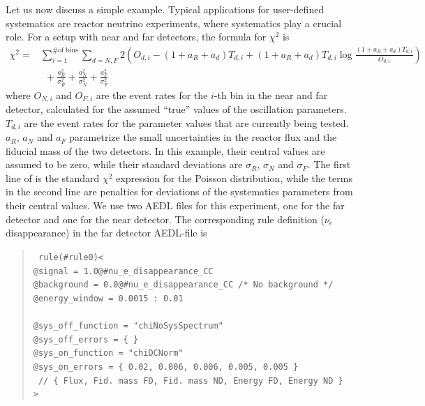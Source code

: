 Let us now discuss a simple example.  Typical applications for user-defined systematics are reactor neutrino experiments, where systematics play a crucial role. For a setup with near and far detectors,
the formula for $\chi^2$ is
\begin{align}
  \chi^2 =& \sum_{i=1}^{\textrm{\# of bins}} \sum_{d = N,F}2
     \left( O_{d,i} - (1 + a_R + a_d) T_{d,i} +
       (1 + a_R + a_d) T_{d,i} \log \frac{(1 + a_R + a_d) T_{d,i}}{O_{d,i}}  \right) \nonumber\\
         & \ \ + \frac{a_R^2}{\sigma_R^2} + \frac{a_N^2}{\sigma_N^2} + \frac{a_F^2}{\sigma_F^2}
\label{equ:chi2reactor}
\end{align}
where $O_{N,i}$ and $O_{F,i}$ are the event rates for the $i$-th bin in the near and
far detector, calculated for the assumed ``true'' values of the oscillation parameters.
$T_{d,i}$ are the event rates for the parameter values that are currently being tested.
$a_R$, $a_N$ and $a_F$ parametrize the small uncertainties in the reactor flux and the fiducial
mass of the two detectors. In this example, their central values are assumed to be zero,
while their standard deviations are $\sigma_R$, $\sigma_N$ and $\sigma_F$.
%
The first line of  is the standard $\chi^2$ expression for
the Poisson distribution, while the terms in the second line are penalties
for deviations of the systematics parameters from their central values. 
%
We use two AEDL files for this experiment, one for the far detector and one for the
near detector.
The corresponding rule definition ($\nu_e$ disappearance) in the far detector AEDL-file is
\begin{quote}
{\tt
rule(\#rule0)< \\
\hspace*{0.5cm}        @signal     = 1.0@\#nu\_e\_disappearance\_CC \\
\hspace*{0.5cm}        @background = 0.0@\#nu\_e\_disappearance\_CC   /* No background */ \\
\hspace*{0.5cm} @energy\_window = 0.0015 : 0.01 \\
\\
\hspace*{0.5cm}        @sys\_off\_function = "chiNoSysSpectrum" \\
\hspace*{0.5cm}        @sys\_off\_errors   = \{ \} \\
\hspace*{0.5cm}        @sys\_on\_function  = "chiDCNorm" \\
\hspace*{0.5cm}        @sys\_on\_errors    = \{ 0.02,    0.006,        0.006,       0.005,     0.005   \} \\
\hspace*{0.5cm}        \mbox{ // \{ Flux, Fid. mass FD, Fid. mass ND, Energy FD, Energy ND \} } \\
> 
}
\end{quote}
